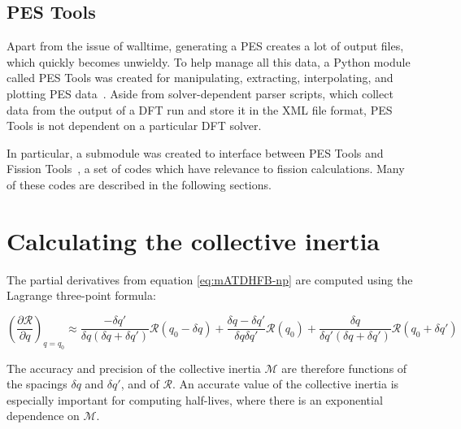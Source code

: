 
\subsection{PES Tools}
Apart from the issue of walltime, generating a PES creates a lot of output files, which quickly becomes unwieldy. To help manage all this data, a Python module called PES Tools was created for manipulating, extracting, interpolating, and plotting PES data~\cite{PES_tools}. Aside from solver-dependent parser scripts, which collect data from the output of a DFT run and store it in the XML file format, PES Tools is not dependent on a particular DFT solver.

In particular, a submodule was created to interface between PES Tools and Fission Tools~\cite{fission_tools}, a set of codes which have relevance to fission calculations. Many of these codes are described in the following sections.

\section{Calculating the collective inertia}\label{sect:M_numerical}
The partial derivatives from equation \eqref{eq:mATDHFB-np} are computed using the Lagrange three-point formula:

\begin{equation}\label{eq:finite-diffs}
\left(\frac{\partial \mathcal{R}}{\partial q}\right)_{q=q_0} \approx 
    \frac{-\delta q'}{\delta q \left(\delta q + \delta q'\right)}\mathcal{R}(q_0-\delta q) + 
    \frac{\delta q - \delta q'}{\delta q \delta q'}\mathcal{R}(q_0) + 
    \frac{\delta q}{\delta q' \left(\delta q + \delta q'\right)}\mathcal{R}(q_0+\delta q')
\end{equation}

The accuracy and precision of the collective inertia $\mathcal{M}$ are therefore functions of the spacings $\delta q$ and $\delta q'$, and of $\mathcal{R}$. An accurate value of the collective inertia is especially important for computing half-lives, where there is an exponential dependence on $\mathcal{M}$.

